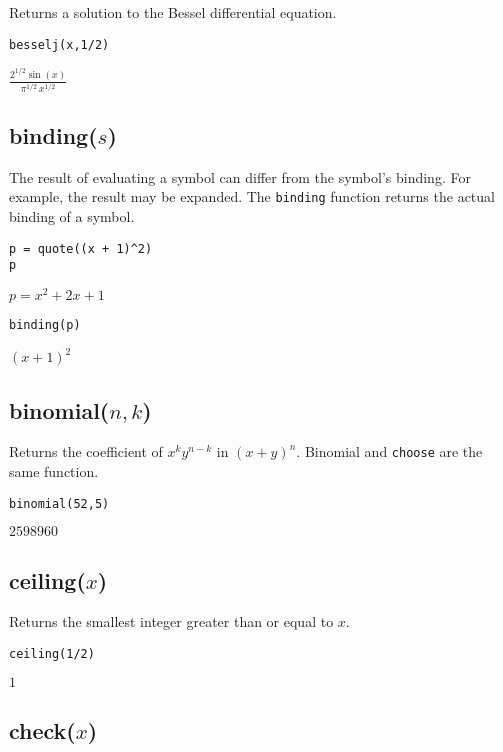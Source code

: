 Returns a solution to the Bessel differential equation.

{\color{blue}
\begin{verbatim}
besselj(x,1/2)
\end{verbatim}
}

\noindent
$\displaystyle \frac{2^{1/2}\sin(x)}{\pi^{1/2}\,x^{1/2}}$

\subsection*{binding($s$)}

The result of evaluating a symbol can differ from the symbol's binding.
For example, the result may be expanded.
The {\tt binding} function returns the actual binding of a symbol.

{\color{blue}
\begin{verbatim}
p = quote((x + 1)^2)
p
\end{verbatim}
}

\noindent
$p=x^2+2x+1$

{\color{blue}
\begin{verbatim}
binding(p)
\end{verbatim}
}

\noindent
$(x+1)^2$

\subsection*{binomial($n,k$)}

Returns the coefficient of $x^ky^{n-k}$ in $(x+y)^n$.
Binomial and {\tt choose} are the same function.

{\color{blue}
\begin{verbatim}
binomial(52,5)
\end{verbatim}
}

\noindent
$2598960$

\subsection*{ceiling($x$)}

Returns the smallest integer greater than or equal to $x$.

{\color{blue}
\begin{verbatim}
ceiling(1/2)
\end{verbatim}
}

\noindent
$1$

\subsection*{check($x$)}


